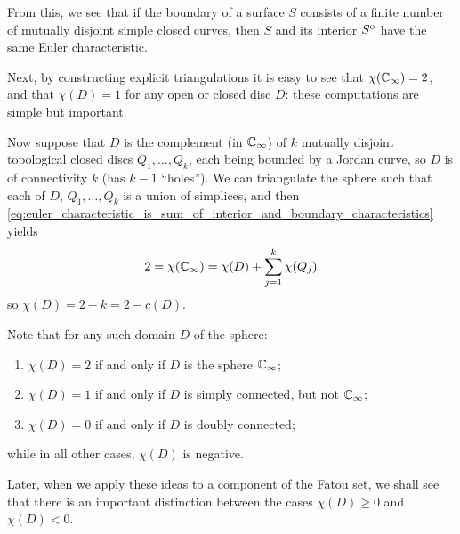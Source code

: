 \begin{remark}[If the boundary of $S$ is a finite number of mutually disjoint simple closed curves: $\chi(S) = \chi(\interior{S})$]
    From this, we see that if the boundary of a surface $S$ consists of a finite
    number of mutually disjoint simple closed curves, then $S$ and its interior
    ${S}^{\mathrm{o}}$ have the same Euler characteristic.
\end{remark}

\begin{remark}[$\chi(\ExtC) = 2$ and $\chi(D) = 1$ for any open or closed disc $D$]
    Next, by constructing explicit triangulations it is easy to see that
    $\chi(\ExtC) = 2$, and that $\chi(D) = 1$ for any open or closed disc $D$:
    these computations are simple but important.
\end{remark}

Now suppose that $D$ is the complement (in $\mathbb{C}_\infty$) of $k$ mutually disjoint
topological closed discs $Q_1, \dots, Q_k$, each being bounded by a Jordan
curve, so $D$ is of connectivity $k$ (has $k-1$ \enquote{holes}). We can
triangulate the sphere such that each of $D$, $Q_1, \dots, Q_k$ is a union of
simplices, and then
\eqref{eq:euler_characteristic_is_sum_of_interior_and_boundary_characteristics}
yields
\begin{equation*}
    2 = \chi(\mathbb{C}_\infty) = \chi(D) + \sum_{j=1}^k \chi(Q_j)
\end{equation*}
so $\chi(D) = 2 - k = 2 - c(D)$.

\begin{remark}
    Note that for any such domain $D$ of the sphere:
    \begin{enumerate}[label=(\roman*)]
        \item $\chi(D) = 2$ if and only if $D$ is the sphere $\mathbb{C}_\infty$;
        \item $\chi(D) = 1$ if and only if $D$ is simply connected, but not
        $\mathbb{C}_\infty$;
        \item $\chi(D) = 0$ if and only if $D$ is doubly connected;
    \end{enumerate}
    while in all other cases, $\chi(D)$ is negative.
\end{remark}

Later, when we apply these ideas to a component of the Fatou set, we shall see
that there is an important distinction between the cases $\chi(D) \geq 0$ and
$\chi(D) < 0$.


